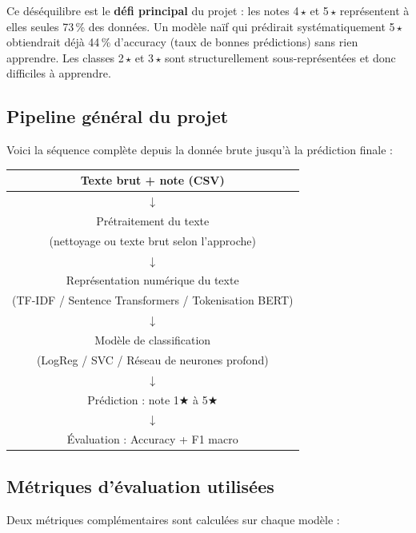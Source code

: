 \documentclass[12pt, a4paper]{article}
\begin{document}
Ce déséquilibre est le \textbf{défi principal} du projet : les notes 4\,$\star$ et
5\,$\star$ représentent à elles seules 73\,\% des données. Un modèle naïf qui prédirait
systématiquement 5\,$\star$ obtiendrait déjà 44\,\% d'accuracy (taux de bonnes prédictions)
sans rien apprendre. Les classes 2\,$\star$ et 3\,$\star$ sont structurellement
sous-représentées et donc difficiles à apprendre.

\subsection{Pipeline général du projet}

Voici la séquence complète depuis la donnée brute jusqu'à la prédiction finale :

\begin{center}
\ttfamily\small
\begin{tabular}{c}
\hline
Texte brut + note (CSV) \\
\hline
$\downarrow$ \\
\hline
Prétraitement du texte \\
(nettoyage ou texte brut selon l'approche) \\
\hline
$\downarrow$ \\
\hline
Représentation numérique du texte \\
(TF-IDF / Sentence Transformers / Tokenisation BERT) \\
\hline
$\downarrow$ \\
\hline
Modèle de classification \\
(LogReg / SVC / Réseau de neurones profond) \\
\hline
$\downarrow$ \\
\hline
Prédiction : note 1★ à 5★ \\
\hline
$\downarrow$ \\
\hline
Évaluation : Accuracy + F1 macro \\
\hline
\end{tabular}
\end{center}

\subsection{Métriques d'évaluation utilisées}

Deux métriques complémentaires sont calculées sur chaque modèle :
\end{document}

